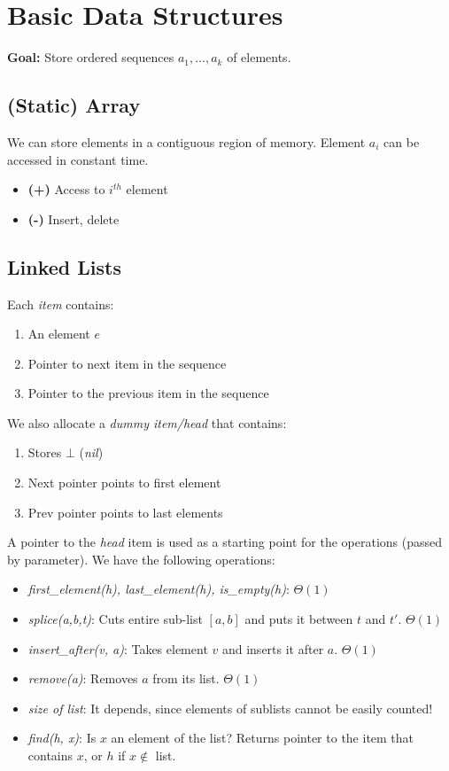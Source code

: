 \section{Basic Data Structures}

\noindent \textbf{Goal:} Store ordered sequences $a_1, \ldots, a_k$ of elements.

\subsection{(Static) Array}

We can store elements in a contiguous region of memory. Element $a_i$ can be accessed in constant time.

\begin{itemize}
\item \textbf{(+)} Access to $i^{th}$ element
\item \textbf{(-)} Insert, delete
\end{itemize}

\subsection{Linked Lists}

\noindent Each \emph{item} contains:
\begin{enumerate}
\item An element $e$
\item Pointer to next item in the sequence
\item Pointer to the previous item in the sequence
\end{enumerate}

\noindent We also allocate a \emph{dummy item/head} that contains:
\begin{enumerate}
\item Stores $\bot$ (\emph{nil})
\item Next pointer points to first element
\item Prev pointer points to last elements
\end{enumerate}

A pointer to the \emph{head} item is used as a starting point for the operations (passed by parameter). We have the following operations:

\begin{itemize}
\item \emph{first\_element(h), last\_element(h), is\_empty(h)}: $\Theta(1)$
\item \emph{splice(a,b,t)}: Cuts entire sub-list $[a,b]$ and puts it between $t$ and $t'$. $\Theta(1)$
\item \emph{insert\_after(v, a)}: Takes element $v$ and inserts it after $a$. $\Theta(1)$
\item \emph{remove(a)}: Removes $a$ from its list. $\Theta(1)$
\item \emph{size of list}: It depends, since elements of sublists cannot be easily counted!
\item \emph{find(h, x)}: Is $x$ an element of the list? Returns pointer to the item that contains $x$, or $h$ if $x \notin $ list.
\end{itemize}

